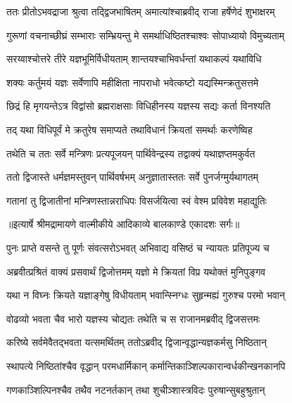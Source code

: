 \twolineshloka
{ततः प्रीतोऽभवद्राजा श्रुत्वा तद्द्विजभाषितम्}
{अमात्यांश्चाब्रवीद् राजा हर्षेणेदं शुभाक्षरम्} %

\twolineshloka
{गुरूणां वचनाच्छीघ्रं सम्भाराः सम्भ्रियन्तु मे}
{समर्थाधिष्ठितश्चाश्वः सोपाध्यायो विमुच्यताम्} %

\twolineshloka
{सरय्वाश्चोत्तरे तीरे यज्ञभूमिर्विधीयताम्}
{शान्तयश्चाभिवर्धन्तां यथाकल्पं यथाविधि} %

\twolineshloka
{शक्यः कर्तुमयं यज्ञः सर्वेणापि महीक्षिता}
{नापराधो भवेत्कष्टो यद्यस्मिन्क्रतुसत्तमे} %

\twolineshloka
{छिद्रं हि मृगयन्तेऽत्र विद्वांसो ब्रह्मराक्षसाः}
{विधिहीनस्य यज्ञस्य सद्यः कर्ता विनश्यति} %

\twolineshloka
{तद् यथा विधिपूर्वं मे क्रतुरेष समाप्यते}
{तथाविधानं क्रियतां समर्थाः करणेष्विह} %

\twolineshloka
{तथेति च ततः सर्वे मन्त्रिणः प्रत्यपूजयन्}
{पार्थिवेन्द्रस्य तद्वाक्यं यथाज्ञप्तमकुर्वत} %

\twolineshloka
{ततो द्विजास्ते धर्मज्ञमस्तुवन् पार्थिवर्षभम्}
{अनुज्ञातास्ततः सर्वे पुनर्जग्मुर्यथागतम्} %

\twolineshloka
{गतानां तु द्विजातीनां मन्त्रिणस्तान्नराधिपः}
{विसर्जयित्वा स्वं वेश्म प्रविवेश महाद्युतिः} %


{॥इत्यार्षे श्रीमद्रामायणे वाल्मीकीये आदिकाव्ये बालकाण्डे एकादशः सर्गः॥}


\twolineshloka
{पुनः प्राप्ते वसन्ते तु पूर्णः संवत्सरोऽभवत्}
{अभिवाद्य वसिष्ठं च न्यायतः प्रतिपूज्य च} %

\twolineshloka
{अब्रवीत्प्रश्रितं वाक्यं प्रसवार्थं द्विजोत्तमम्}
{यज्ञो मे क्रियतां विप्र यथोक्तं मुनिपुङ्गव} %

\twolineshloka
{यथा न विघ्नः क्रियते यज्ञाङ्गेषु विधीयताम्}
{भवान्स्निग्धः सुहृन्मह्यं गुरुश्च परमो भवान्} %

\twolineshloka
{वोढव्यो भवता चैव भारो यज्ञस्य चोद्यतः}
{तथेति च स राजानमब्रवीद् द्विजसत्तमः} %

\twolineshloka
{करिष्ये सर्वमेवैतद्भवता यत्समर्थितम्}
{ततोऽब्रवीद् द्विजान्वृद्धान्यज्ञकर्मसु निष्ठितान्} %

\twolineshloka
{स्थापत्ये निष्ठितांश्चैव वृद्धान् परमधार्मिकान्}
{कर्मान्तिकाञ्शिल्पकारान्वर्धकीन्खनकानपि} %

\twolineshloka
{गणकाञ्शिल्पिनश्चैव तथैव नटनर्तकान्}
{तथा शुचीञ्शास्त्रविदः पुरुषान्सुबहुश्रुतान्} %

